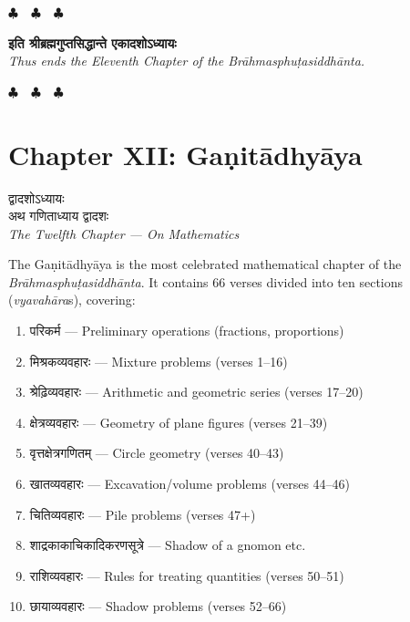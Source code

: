 \documentclass[11pt,a4paper]{article}
\newcommand{\dev}[1]{{\devanagarifont #1}}
\newcommand{\chapterend}{%
  \begin{center}%
  \textcolor{endmarkcolor}{$\clubsuit$~~$\clubsuit$~~$\clubsuit$}%
  \end{center}%
}
\begin{document}
\vspace{0.5cm}
\chapterend
\begin{center}
\dev{\textbf{इति श्रीब्रह्मगुप्तसिद्धान्ते एकादशोऽध्यायः}}\\[0.2cm]
\textit{Thus ends the Eleventh Chapter of the Brāhmasphuṭasiddhānta.}
\end{center}
\chapterend

\newpage

\section*{Chapter XII: Gaṇitādhyāya}

\begin{center}
\dev{द्वादशोऽध्यायः}\\[0.2cm]
\dev{अथ गणिताध्याय द्वादशः}\\[0.3cm]
\textit{The Twelfth Chapter --- On Mathematics}
\end{center}

The Gaṇitādhyāya is the most celebrated mathematical chapter of the
\textit{Brāhmasphuṭasiddhānta}. It contains 66 verses divided into ten sections
(\textit{vyavahāra}s), covering:

\begin{enumerate}[label=\arabic*.]
  \item \dev{परिकर्म} --- Preliminary operations (fractions, proportions)
  \item \dev{मिश्रकव्यवहारः} --- Mixture problems (verses 1--16)
  \item \dev{श्रेढ़िव्यवहारः} --- Arithmetic and geometric series (verses 17--20)
  \item \dev{क्षेत्रव्यवहारः} --- Geometry of plane figures (verses 21--39)
  \item \dev{वृत्तक्षेत्रगणितम्} --- Circle geometry (verses 40--43)
  \item \dev{खातव्यवहारः} --- Excavation/volume problems (verses 44--46)
  \item \dev{चितिव्यवहारः} --- Pile problems (verses 47+)
  \item \dev{शाद्रकाकाचिकादिकरणसूत्रे} --- Shadow of a gnomon etc.
  \item \dev{राशिव्यवहारः} --- Rules for treating quantities (verses 50--51)
  \item \dev{छायाव्यवहारः} --- Shadow problems (verses 52--66)
\end{enumerate}
\end{document}
